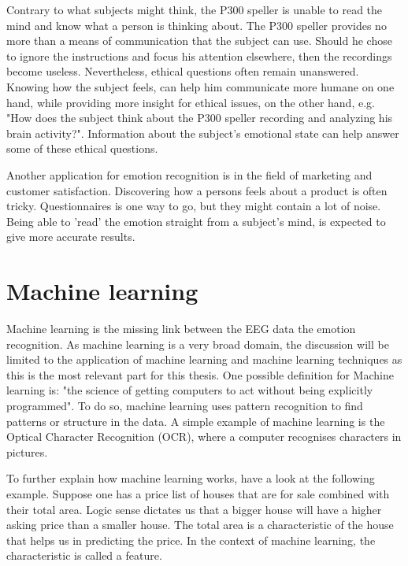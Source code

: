 \npar

Contrary to what subjects might think, the P300 speller is unable to read the mind and know what a person is thinking about\cite{P300Origin}. The P300 speller provides no more than a means of communication that the subject can use. Should he chose to ignore the instructions and focus his attention elsewhere, then the recordings become useless. Nevertheless, ethical questions often remain unanswered. Knowing how the subject feels, can help him communicate more humane on one hand, while providing more insight for ethical issues, on the other hand, e.g. "How does the subject think about the P300 speller recording and analyzing his brain activity?". Information about the subject's emotional state can help answer some of these ethical questions.

\npar

Another application for emotion recognition is in the field of marketing and customer satisfaction. Discovering how a persons feels about a product is often tricky. Questionnaires is one way to go, but they might contain a lot of noise. Being able to 'read' the emotion straight from a subject's mind, is expected to give more accurate results.

\section{Machine learning}
Machine learning is the missing link between the EEG data the emotion recognition. As machine learning is a very broad domain, the discussion will be limited to the application of machine learning and machine learning techniques as this is the most relevant part for this thesis. One possible definition for Machine learning is: "the science of getting computers to act without being explicitly programmed". To do so, machine learning uses pattern recognition to find patterns or structure in the data. A simple example of machine learning is the Optical Character Recognition (OCR), where a computer recognises characters in pictures.

\npar

To further explain how machine learning works, have a look at the following example. Suppose one has a price list of houses that are for sale combined with their total area. Logic sense dictates us that a bigger house will have a higher asking price than a smaller house. The total area is a characteristic of the house that helps us in predicting the price. In the context of machine learning, the characteristic is called a feature.

